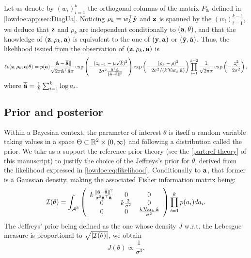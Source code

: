 Let us denote by $(w_i)_{i=1}^k$ the orthogonal columns of the matrix $P_{\mathbf{a}}$ defined in \cref{lowdoe:app:sec:DiagUa}. Noticing $\rho_k = w_k^{\top}\hat{\mathbf{y}}$ and $\mathbf{z}$ is spanned by the $(w_{i})_{i=1}^{k-1}$, we deduce that $\mathbf{z}$ and $\rho_k$ are independent conditionally to $(\mathbf{a}, \theta)$, and that the knowledge of $(\mathbf{z},\rho_k,\mathbf{a})$ is equivalent to the one of $(\mathbf{y},\mathbf{a})$ or $(\hat{\mathbf{y}},\hat{\mathbf{a}})$.
Thus, the likelihood issued from the observation of $(\mathbf{z}, \rho_k, \mathbf{a})$ is 
\begin{equation}\label{lowdoe:eq:likelihood}
     \ell_k(\mathbf{z},\rho_k,\mathbf{a}|\theta) = p(\mathbf{a})\frac{\|\hat{\mathbf{a}}-\overline{\hat{\mathbf{a}}}\|}{\sqrt{2\pi\hat{\mathbf{a}}^{\top}\hat{\mathbf{a}}}\sigma}\exp\left(-\frac{(z_{k-1}-\mu \sqrt{k})^2}{2\sigma^2\frac{\hat{\mathbf{a}}^{\top}\hat{\mathbf{a}}}{\|\hat{\mathbf{a}}-\overline{\hat{\mathbf{a}}}\|^2}}\right)\exp\left({-\frac{(\rho_k-\rho)^2}{2\sigma^2/(k\operatorname{Var}_k\hat{\mathbf{a}})}}\right)\prod_{i=1}^{k-2}\frac{1}{\sqrt{2\pi}\sigma}\exp\left(-\frac{z_i^2}{2\sigma^2}\right),
\end{equation}
where $\overline{\hat{\mathbf{a}}} = \frac{1}{k}\sum_{i=1}^k \log a_i$.


    \subsection{Prior and posterior}\label{lowdoe:sec:priorposterior}
%


Within a Bayesian context, the parameter of interest $\theta$ is itself a random variable taking values in a space $\Theta\subset\mathbb{R}^2\times(0,\infty)$ and following a distribution called the prior.
We take as a support the reference prior theory (see the \cref{part:ref-theory} of this manuscript) to justify the choice of the Jeffreys's prior for $\theta$, derived from the likelihood expressed in \cref{lowdoe:eq:likelihood}.
Conditionally to $\mathbf{a}$, that former is a Gaussian density, making the associated Fisher information matrix being:
       \begin{equation}    
        \mathcal{I}(\theta) = \int_{\mathcal{A}^k}\left(\begin{array}{ccc}
             k\frac{\|\hat{\mathbf{a}} - \overline{\hat{\mathbf{a}}}\|^2}{\sigma^2\hat{\mathbf{a}}^{\top}\hat{\mathbf{a}}}&  0&0\\
             0&k\frac{2}{\sigma^2}&0 \\
             0&0& \frac{k\operatorname{Var}_k\hat{\mathbf{a}}}{\sigma^2}
        \end{array}\right) \prod_{i=1}^kp(a_i)d a_i.
    \end{equation}
The Jeffreys' prior being defined as the one whose density $J$ w.r.t.{ }the Lebesgue measure is proportional to $\sqrt{|\mathcal{I}(\theta)|}$, we obtain
\begin{equation}
    J(\theta)\propto \frac{1}{\sigma^3}.
\end{equation}

